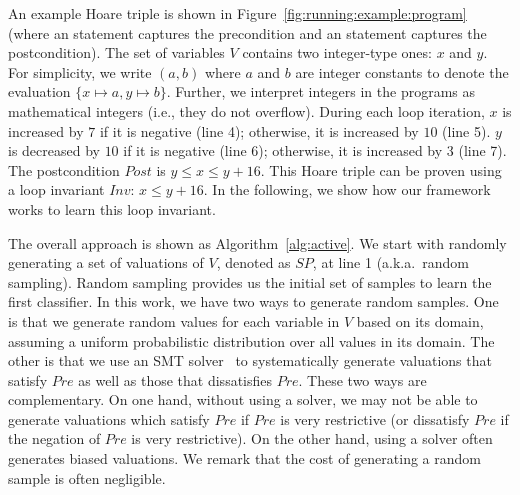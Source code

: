 \begin{example}
An example Hoare triple is shown in Figure~\ref{fig:running:example:program} (where an  statement captures the precondition and an  statement captures the postcondition).
The set of variables $V$ contains two integer-type ones: $x$ and $y$. For simplicity, we write $(a, b)$ where $a$ and $b$ are integer constants to denote the  evaluation $\{x \mapsto a, y \mapsto b\}$. Further, we interpret integers in the programs as mathematical integers (i.e., they do not overflow).
During each loop iteration, $x$ is increased by $7$ if it is negative (line 4); otherwise, it is increased by $10$ (line 5).
$y$ is decreased by $10$ if it is negative (line 6);
otherwise, it is increased by $3$ (line 7).
The postcondition $Post$ is $y \le x \le y + 16$.
This Hoare triple can be proven using a loop invariant $\mathit{Inv}$: $\mathit{x \le y + 16}$.
In the following, we show how our framework works to learn this loop invariant.
\end{example}
\noindent The overall approach is shown as Algorithm~\ref{alg:active}. We start with randomly generating a set of valuations of $V$, denoted as $SP$, at line 1 (a.k.a.~random sampling). Random sampling provides us the initial set of samples to learn the first classifier.
In this work, we have two ways to generate random samples. One is that we generate random values for each variable in $V$ based on its domain,
assuming a uniform probabilistic distribution over all values in its domain.
The other is that we use an SMT solver~\cite{barrett2009satisfiability,de2008z3} to systematically generate valuations that satisfy $Pre$
as well as those that dissatisfies $Pre$. These two ways are complementary.
On one hand, without using a solver, we may not be able to generate valuations which satisfy $Pre$ if $Pre$ is very restrictive
(or dissatisfy $Pre$ if the negation of $Pre$ is very restrictive).
On the other hand, using a solver often generates biased valuations. We remark that the cost of generating a random sample is often negligible.

